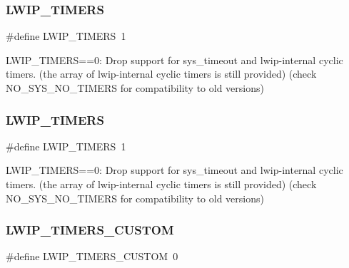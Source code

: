 \subsubsection{\texorpdfstring{L\+W\+I\+P\+\_\+\+T\+I\+M\+E\+RS}{LWIP\_TIMERS}\hspace{0.1cm}{\footnotesize\ttfamily [1/2]}}
{\footnotesize\ttfamily \#define L\+W\+I\+P\+\_\+\+T\+I\+M\+E\+RS~1}

L\+W\+I\+P\+\_\+\+T\+I\+M\+E\+RS==0\+: Drop support for sys\+\_\+timeout and lwip-\/internal cyclic timers. (the array of lwip-\/internal cyclic timers is still provided) (check N\+O\+\_\+\+S\+Y\+S\+\_\+\+N\+O\+\_\+\+T\+I\+M\+E\+RS for compatibility to old versions) \mbox{\label{group__lwip__opts__timers_ga25a41610055f91cbd0960256240b8f2c}} 
\subsubsection{\texorpdfstring{L\+W\+I\+P\+\_\+\+T\+I\+M\+E\+RS}{LWIP\_TIMERS}\hspace{0.1cm}{\footnotesize\ttfamily [2/2]}}
{\footnotesize\ttfamily \#define L\+W\+I\+P\+\_\+\+T\+I\+M\+E\+RS~1}

L\+W\+I\+P\+\_\+\+T\+I\+M\+E\+RS==0\+: Drop support for sys\+\_\+timeout and lwip-\/internal cyclic timers. (the array of lwip-\/internal cyclic timers is still provided) (check N\+O\+\_\+\+S\+Y\+S\+\_\+\+N\+O\+\_\+\+T\+I\+M\+E\+RS for compatibility to old versions) \mbox{\label{group__lwip__opts__timers_gaff0ea56f3e3d8e86c49b50557bc13815}} 
\subsubsection{\texorpdfstring{L\+W\+I\+P\+\_\+\+T\+I\+M\+E\+R\+S\+\_\+\+C\+U\+S\+T\+OM}{LWIP\_TIMERS\_CUSTOM}\hspace{0.1cm}{\footnotesize\ttfamily [1/2]}}
{\footnotesize\ttfamily \#define L\+W\+I\+P\+\_\+\+T\+I\+M\+E\+R\+S\+\_\+\+C\+U\+S\+T\+OM~0}

